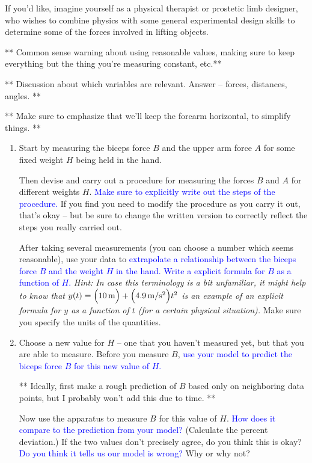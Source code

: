 \documentclass[11pt,letterpaper]{article}
\newcommand{\question}[2][blue]{{ \textcolor{#1}{#2} }}
\begin{document}
If you'd like, imagine yourself as a 
physical therapist or prostetic limb designer,
who wishes to combine physics with some 
general experimental design skills to determine 
some of the forces involved in lifting objects.

** Common sense warning about using reasonable values, 
making sure to keep everything but the thing you're measuring constant, etc.**

** Discussion about which variables are relevant.  Answer -- forces, distances,
angles. **

** Make sure to emphasize that we'll keep the forearm horizontal, 
to simplify things. **

\begin{enumerate}[label=\bf{\arabic*.}]

\item
Start by measuring the biceps force $B$ and the upper arm force $A$ 
for some fixed weight $H$ being held in the hand.

Then devise and carry out a procedure for measuring the forces $B$ and $A$ for
different weights $H$.  
\question{Make sure to explicitly write out the steps of the procedure.}
If you find you need to modify the procedure as you carry it out,
that's okay -- but be sure to change the written version to correctly
reflect the steps you really carried out.

After taking several measurements (you can choose a number which seems
reasonable), use your data to 
\question{extrapolate a relationship between the biceps
force $B$ and the weight $H$ in the hand.}
\question{Write a explicit formula for $B$ as a function of $H$.}
\emph{Hint:  In case this terminology is a bit unfamiliar, 
it might help to know that
$y(t) = \Bigl( 10\,\mathrm{m} \Bigr) +\Bigl( 4.9\,\mathrm{m/s^2} \Bigr)t^2$ 
is an example of an explicit formula 
for $y$ as a function of $t$ (for a certain physical situation).}
Make sure you specify the units of the quantities.

\item
Choose a new value for $H$ -- one that you haven't measured yet,
but that you are able to measure.  
Before you measure $B$, 
\question{use your model to predict the biceps force $B$ 
for this new value of $H$.}

** Ideally, first make a rough prediction of $B$ based only on neighboring data
points, but I probably won't add this due to time. **

Now use the apparatus to measure $B$ for this value of $H$.  
\question{How does it compare to the prediction from your model?  }
(Calculate the percent deviation.)
If the two values don't precisely agree, do
you think this is okay?  
\question{Do you think it tells us our model is wrong?}
Why or why not?

\end{enumerate}
\end{document}

